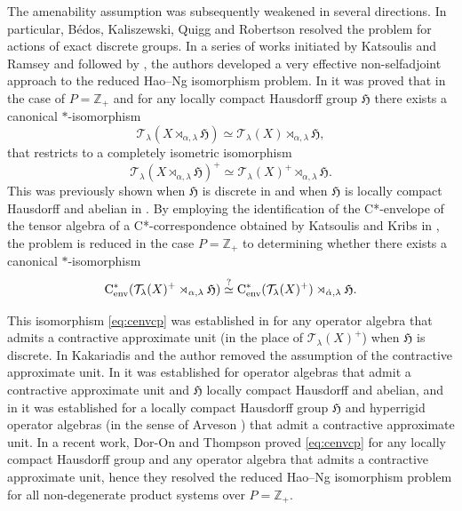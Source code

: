 \documentclass[11pt,final]{amsart}
\numberwithin{equation}{section}
\theoremstyle{plain}
\theoremstyle{definition}
\theoremstyle{remark}
\newcommand{\T}{{\mathcal{T}}}
\def\al{\alpha}
\def\la{\lambda}
\newcommand{\bZ}{\mathbb{Z}}
\newcommand{\fH}{{\mathfrak{H}}}
\newcommand{\cenv}{\mathrm{C}^*_{\textup{env}}}
\begin{document}
The amenability assumption
was subsequently weakened in several directions. In particular, B\'edos, Kaliszewski,
Quigg and Robertson \cite{BKQR15} resolved the problem for actions of exact discrete groups. In a series of works initiated by Katsoulis and Ramsey \cite{KR19} and followed by \cite{Kat17, KR21}, the authors developed a very effective non-selfadjoint approach to the reduced Hao--Ng isomorphism problem. In \cite{KR21} it was proved that in the case of $P=\bZ_+$ and for any locally compact Hausdorff group $\fH$ there exists a canonical $*$-isomorphism
\[
\T_\la(X \rtimes_{\al, \la} \fH) {\simeq} \T_\la(X) \rtimes_{\al, \la} \fH,
\]
that restricts to a completely isometric isomorphism
\[
\T_\la(X \rtimes_{\al, \la} \fH)^+ {\simeq} \T_\la(X)^+ \rtimes_{\al, \la} \fH. 
\]
This was previously shown when $\fH$ is discrete in \cite{Kat17} and when $\fH$ is locally compact Hausdorff and abelian in \cite{KR19}.
By employing the identification of the C*-envelope of the tensor algebra of a C*-correspondence obtained by Katsoulis and Kribs in \cite{KK06}, the problem is reduced in the case $P=\bZ_+$ to determining whether there exists a canonical $*$-isomorphism
\begin{equation} \label{eq:cenvcp}
\cenv(\T_\la(X)^+ \rtimes_{\al, \la} \fH)\stackrel{?}{\simeq} \cenv(\T_\la(X)^+) \rtimes_{\dot{\al}, \la} \fH.    
\end{equation}

This isomorphism \eqref{eq:cenvcp} was established in \cite{Kat17} for any operator algebra that admits a contractive approximate unit (in the place of $\T_\la(X)^+$) when $\fH$ is discrete. In \cite{KP25} Kakariadis and the author removed the assumption of the contractive approximate unit. In \cite{KR19} it was established for operator algebras that admit a contractive approximate unit and $\fH$ locally compact Hausdorff and abelian, and in \cite{KR21} it was established for a locally compact Hausdorff group $\fH$ and hyperrigid operator algebras (in the sense of Arveson \cite{Arv11}) that admit a contractive approximate unit.  In a recent work,
Dor-On and Thompson \cite{DT26} proved \eqref{eq:cenvcp} for any locally compact Hausdorff group and any operator algebra that admits a contractive approximate unit, hence they resolved the reduced Hao--Ng isomorphism problem for all
non-degenerate product systems over $P=\bZ_+$.
\end{document}
